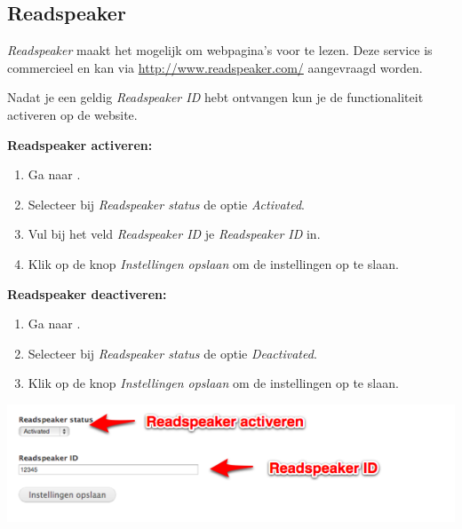 \subsection{Readspeaker}\label{readspeaker}
\emph{Readspeaker} maakt het mogelijk om webpagina's voor te lezen. Deze service is commercieel en kan via \url{http://www.readspeaker.com/} aangevraagd worden. 

Nadat je een geldig \emph{Readspeaker ID} hebt ontvangen kun je de functionaliteit activeren op de website. 

\textbf{Readspeaker activeren:}

\begin{enumerate}
\item Ga naar  .
\item Selecteer bij \emph{Readspeaker status} de optie \emph{Activated}.
\item Vul bij het veld \emph{Readspeaker ID} je \emph{Readspeaker ID} in.
\item Klik op de knop \emph{Instellingen opslaan} om de instellingen op te slaan.
\end{enumerate}

\textbf{Readspeaker deactiveren:}

\begin{enumerate}
\item Ga naar  .
\item Selecteer bij \emph{Readspeaker status} de optie \emph{Deactivated}.
\item Klik op de knop \emph{Instellingen opslaan} om de instellingen op te slaan.
\end{enumerate}

\begin{center}
	\includegraphics[width=\textwidth]{img/readspeaker.png}
\end{center}